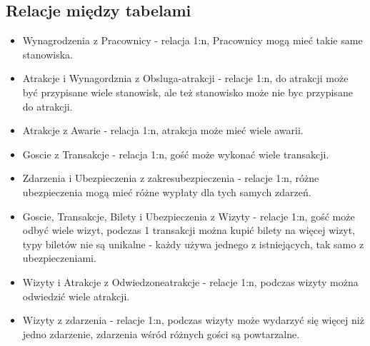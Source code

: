 \documentclass{article}
\begin{document}
\subsection{Relacje między tabelami}
\begin{itemize}
    \item Wynagrodzenia z Pracownicy - relacja 1:n, Pracownicy mogą mieć takie same stanowiska.
    \item Atrakcje i Wynagordznia z Obsluga-atrakcji - relacje 1:n, do atrakcji może być przypisane wiele stanowisk, ale też stanowisko może nie byc przypisane do atrakcji.
    \item Atrakcje z Awarie - relacja 1:n, atrakcja może mieć wiele awarii.
    \item Goscie z Transakcje - relacja 1:n, gość może wykonać wiele transakcji.
    \item Zdarzenia i Ubezpieczenia z zakres\textunderscore ubezpieczenia - relacje 1:n, różne ubezpieczenia mogą mieć różne wypłaty dla tych samych zdarzeń.
    \item Goscie, Transakcje, Bilety i Ubezpieczenia z Wizyty - relacje 1:n, gość może odbyć wiele wizyt, podczas 1 transakcji można kupić bilety na więcej wizyt, typy biletów nie są unikalne - każdy używa jednego z istniejących, tak samo z ubezpieczeniami.
    \item Wizyty i Atrakcje z Odwiedzone\textunderscore atrakcje - relacje 1:n, podczas wizyty można odwiedzić wiele atrakcji.
    \item Wizyty z zdarzenia - relacje 1:n, podczas wizyty może wydarzyć się więcej niż jedno zdarzenie, zdarzenia wśród różnych gości są powtarzalne.
\end{itemize}
\end{document}
